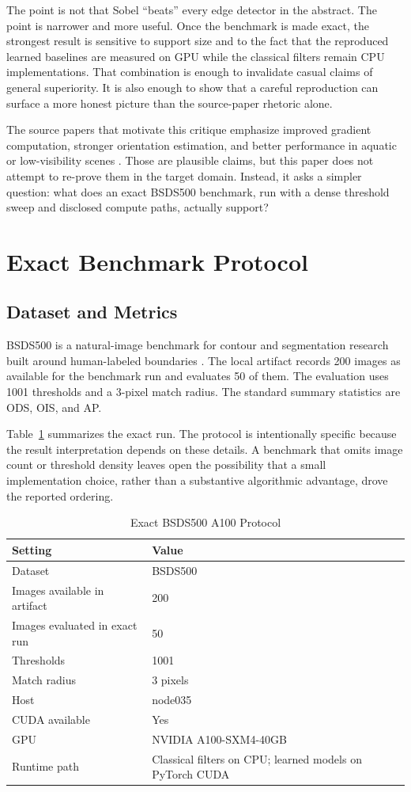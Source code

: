 \documentclass[conference]{IEEEtran}
\begin{document}
The point is not that Sobel ``beats'' every edge detector in the abstract. The point is narrower and more useful. Once the benchmark is made exact, the strongest result is sensitive to support size and to the fact that the reproduced learned baselines are measured on GPU while the classical filters remain CPU implementations. That combination is enough to invalidate casual claims of general superiority. It is also enough to show that a careful reproduction can surface a more honest picture than the source-paper rhetoric alone.

The source papers that motivate this critique emphasize improved gradient computation, stronger orientation estimation, and better performance in aquatic or low-visibility scenes \cite{bagan2023thesis,bagan2024oceans,bagan2025oceans}. Those are plausible claims, but this paper does not attempt to re-prove them in the target domain. Instead, it asks a simpler question: what does an exact BSDS500 benchmark, run with a dense threshold sweep and disclosed compute paths, actually support?

\section{Exact Benchmark Protocol}
\subsection{Dataset and Metrics}
BSDS500 is a natural-image benchmark for contour and segmentation research built around human-labeled boundaries \cite{bsdsweb,arbelaez2011}. The local artifact records 200 images as available for the benchmark run and evaluates 50 of them. The evaluation uses 1001 thresholds and a 3-pixel match radius. The standard summary statistics are ODS, OIS, and AP.

Table~\ref{tab:protocol} summarizes the exact run. The protocol is intentionally specific because the result interpretation depends on these details. A benchmark that omits image count or threshold density leaves open the possibility that a small implementation choice, rather than a substantive algorithmic advantage, drove the reported ordering.

\begin{table}[t]
\centering
\caption{Exact BSDS500 A100 Protocol}
\label{tab:protocol}
\begin{tabular}{@{}ll@{}}
\toprule
Setting & Value \\
\midrule
Dataset & BSDS500 \\
Images available in artifact & 200 \\
Images evaluated in exact run & 50 \\
Thresholds & 1001 \\
Match radius & 3 pixels \\
Host & node035 \\
CUDA available & Yes \\
GPU & NVIDIA A100-SXM4-40GB \\
Runtime path & Classical filters on CPU; learned models on PyTorch CUDA \\
\bottomrule
\end{tabular}
\end{table}
\end{document}
